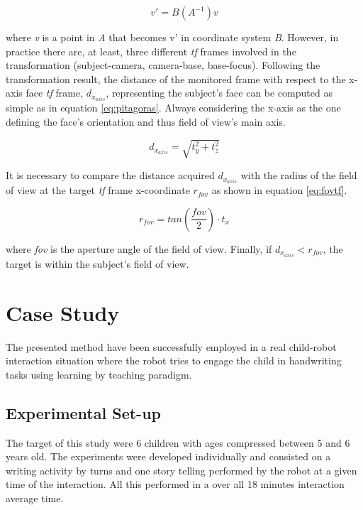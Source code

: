 \documentclass{sig-alternate}
\begin{document}
\begin{equation}
v' = B(A^{-1})v
\label{eq:transform}
\end{equation}

where \textit{v} is a point in \textit{A} that becomes v' in coordinate system \textit{B}. However, in practice there are, at least, three different \textit{tf} frames involved in the transformation (subject-camera, camera-base, base-focus). Following the transformation result, the distance of the monitored frame with respect to the x-axis face \textit{tf} frame, $ d_{x_{axis}} $, representing the subject's face can be computed as simple as in equation \ref{eq:pitagoras}. Always considering the x-axis as the one defining the face's orientation and thus field of view's main axis.

\begin{equation}
d_{x_{axis}} = \sqrt{t_y^2 + t_z^2}
\label{eq:pitagoras}
\end{equation}

It is necessary to compare the distance acquired $ d_{x_{axis}} $ with the radius of the field of view at the target \textit{tf} frame x-coordinate $ r_{fov} $ as shown in equation \ref{eq:fovtf}.

\begin{equation}
r_{fov} = tan\left(\frac{fov}{2}\right) \cdot t_x
\label{eq:fovtf}
\end{equation}

where \textit{fov} is the aperture angle of the field of view. Finally, if $ d_{x_{axis}}<r_{fov} $, the target is within the subject's field of view.


\section{Case Study}
The presented method have been successfully employed in a real child-robot interaction situation where the robot tries to engage the child in handwriting tasks using learning by teaching paradigm.
\subsection{Experimental Set-up}

The target of this study were 6 children with ages compressed between 5 and 6 years old. The experiments were developed individually and consisted on a writing activity by turns and one story telling performed by the robot at a given time of the interaction. All this performed in a over all 18 minutes interaction average time.
\end{document}
